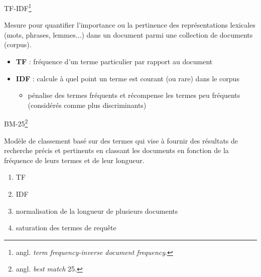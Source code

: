 \begin{frame}{\textsc{TF-IDF}\footnote{angl. \textit{term frequency-inverse document frequency}.}}

\begin{block}{}
Mesure pour quantifier l'importance ou la pertinence des représentations lexicales (mots, phrases, lemmes$\dots$) dans un document parmi une collection de documents (corpus).
\end{block}
\begin{itemize}
\item \textbf{TF} : fréquence d'un terme particulier par rapport au document
\item \textbf{IDF} : calcule à quel point un terme est courant (ou rare) dans le corpus
\begin{itemize}
\item pénalise des termes fréquents et récompense les termes peu fréquents (considérés comme plus discriminants)
\end{itemize}
\end{itemize}
\end{frame}

\begin{frame}{\textsc{BM-25}\footnote{angl. \textit{best match} 25.}}

\begin{block}{}
\justifying
Modèle de classement basé sur des termes qui vise à fournir des résultats de recherche précis et pertinents en classant les documents en fonction de la fréquence de leurs termes et de leur longueur.
\end{block}

\begin{enumerate}
\item TF
\item IDF
\item normalisation de la longueur de plusieurs documents
\item saturation des termes de requête
\end{enumerate}
\medskip


\end{frame}

